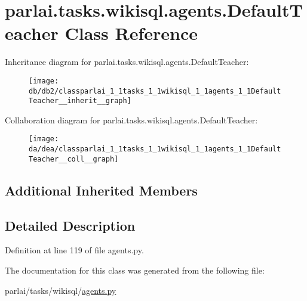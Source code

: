 \hypertarget{classparlai_1_1tasks_1_1wikisql_1_1agents_1_1DefaultTeacher}{}\section{parlai.\+tasks.\+wikisql.\+agents.\+Default\+Teacher Class Reference}
\label{classparlai_1_1tasks_1_1wikisql_1_1agents_1_1DefaultTeacher}


Inheritance diagram for parlai.\+tasks.\+wikisql.\+agents.\+Default\+Teacher\+:\nopagebreak
\begin{figure}[H]
\begin{center}
\leavevmode
\texttt{[image: db/db2/classparlai\_1\_1tasks\_1\_1wikisql\_1\_1agents\_1\_1DefaultTeacher\_\_inherit\_\_graph]}
\end{center}
\end{figure}


Collaboration diagram for parlai.\+tasks.\+wikisql.\+agents.\+Default\+Teacher\+:\nopagebreak
\begin{figure}[H]
\begin{center}
\leavevmode
\texttt{[image: da/dea/classparlai\_1\_1tasks\_1\_1wikisql\_1\_1agents\_1\_1DefaultTeacher\_\_coll\_\_graph]}
\end{center}
\end{figure}
\subsection*{Additional Inherited Members}


\subsection{Detailed Description}


Definition at line 119 of file agents.\+py.



The documentation for this class was generated from the following file\+:\begin{DoxyCompactItemize}
\item 
parlai/tasks/wikisql/\hyperlink{parlai_2tasks_2wikisql_2agents_8py}{agents.\+py}\end{DoxyCompactItemize}

